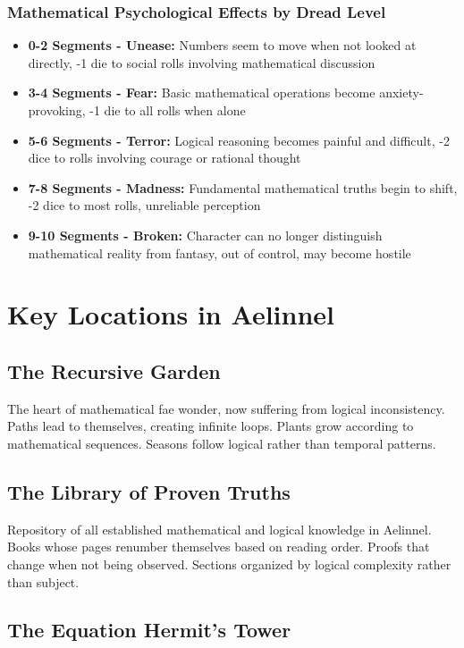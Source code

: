 \documentclass[11pt]{article}
\begin{document}
\subsubsection{Mathematical Psychological Effects by Dread Level}

\begin{itemize}
\item \textbf{0-2 Segments - Unease:} Numbers seem to move when not looked at directly, -1 die to social rolls involving mathematical discussion
\item \textbf{3-4 Segments - Fear:} Basic mathematical operations become anxiety-provoking, -1 die to all rolls when alone
\item \textbf{5-6 Segments - Terror:} Logical reasoning becomes painful and difficult, -2 dice to rolls involving courage or rational thought
\item \textbf{7-8 Segments - Madness:} Fundamental mathematical truths begin to shift, -2 dice to most rolls, unreliable perception
\item \textbf{9-10 Segments - Broken:} Character can no longer distinguish mathematical reality from fantasy, out of control, may become hostile
\end{itemize}

\section{Key Locations in Aelinnel}

\subsection{The Recursive Garden}

The heart of mathematical fae wonder, now suffering from logical inconsistency. Paths lead to themselves, creating infinite loops. Plants grow according to mathematical sequences. Seasons follow logical rather than temporal patterns.

\subsection{The Library of Proven Truths}

Repository of all established mathematical and logical knowledge in Aelinnel. Books whose pages renumber themselves based on reading order. Proofs that change when not being observed. Sections organized by logical complexity rather than subject.

\subsection{The Equation Hermit's Tower}
\end{document}
